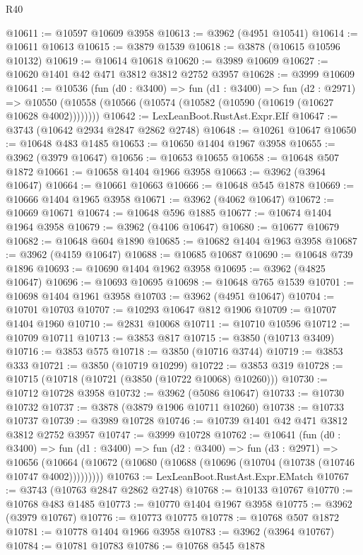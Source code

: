 \begin{lexlean}{R40}
\begin{coremodule}
@10611 := @10597 @10609 @3958
@10613 := @3962 (@4951 @10541)
@10614 := @10611 @10613
@10615 := @3879 @1539
@10618 := @3878 (@10615 @10596 @10132)
@10619 := @10614 @10618
@10620 := @3989 @10609
@10627 := @10620 @1401 @42 @471 @3812 @3812 @2752 @3957
@10628 := @3999 @10609
@10641 := @10536
    (fun (d0 : @3400) =>
    fun (d1 : @3400) =>
    fun (d2 : @2971) =>
    @10550 (@10558 (@10566 (@10574 (@10582 (@10590 (@10619 (@10627 @10628 @4002))))))))
@10642 := LexLeanBoot.RustAst.Expr.EIf
@10647 := @3743 (@10642 @2934 @2847 @2862 @2748)
@10648 := @10261 @10647
@10650 := @10648 @483 @1485
@10653 := @10650 @1404 @1967 @3958
@10655 := @3962 (@3979 @10647)
@10656 := @10653 @10655
@10658 := @10648 @507 @1872
@10661 := @10658 @1404 @1966 @3958
@10663 := @3962 (@3964 @10647)
@10664 := @10661 @10663
@10666 := @10648 @545 @1878
@10669 := @10666 @1404 @1965 @3958
@10671 := @3962 (@4062 @10647)
@10672 := @10669 @10671
@10674 := @10648 @596 @1885
@10677 := @10674 @1404 @1964 @3958
@10679 := @3962 (@4106 @10647)
@10680 := @10677 @10679
@10682 := @10648 @604 @1890
@10685 := @10682 @1404 @1963 @3958
@10687 := @3962 (@4159 @10647)
@10688 := @10685 @10687
@10690 := @10648 @739 @1896
@10693 := @10690 @1404 @1962 @3958
@10695 := @3962 (@4825 @10647)
@10696 := @10693 @10695
@10698 := @10648 @765 @1539
@10701 := @10698 @1404 @1961 @3958
@10703 := @3962 (@4951 @10647)
@10704 := @10701 @10703
@10707 := @10293 @10647 @812 @1906
@10709 := @10707 @1404 @1960
@10710 := @2831 @10068
@10711 := @10710 @10596
@10712 := @10709 @10711
@10713 := @3853 @817
@10715 := @3850 (@10713 @3409)
@10716 := @3853 @575
@10718 := @3850 (@10716 @3744)
@10719 := @3853 @333
@10721 := @3850 (@10719 @10299)
@10722 := @3853 @319
@10728 := @10715 (@10718 (@10721 (@3850 (@10722 @10068) @10260)))
@10730 := @10712 @10728 @3958
@10732 := @3962 (@5086 @10647)
@10733 := @10730 @10732
@10737 := @3878 (@3879 @1906 @10711 @10260)
@10738 := @10733 @10737
@10739 := @3989 @10728
@10746 := @10739 @1401 @42 @471 @3812 @3812 @2752 @3957
@10747 := @3999 @10728
@10762 := @10641
    (fun (d0 : @3400) =>
    fun (d1 : @3400) =>
    fun (d2 : @3400) =>
    fun (d3 : @2971) =>
    @10656 (@10664 (@10672 (@10680 (@10688 (@10696 (@10704 (@10738 (@10746 @10747 @4002)))))))))
@10763 := LexLeanBoot.RustAst.Expr.EMatch
@10767 := @3743 (@10763 @2847 @2862 @2748)
@10768 := @10133 @10767
@10770 := @10768 @483 @1485
@10773 := @10770 @1404 @1967 @3958
@10775 := @3962 (@3979 @10767)
@10776 := @10773 @10775
@10778 := @10768 @507 @1872
@10781 := @10778 @1404 @1966 @3958
@10783 := @3962 (@3964 @10767)
@10784 := @10781 @10783
@10786 := @10768 @545 @1878

\end{coremodule}
\end{lexlean}
